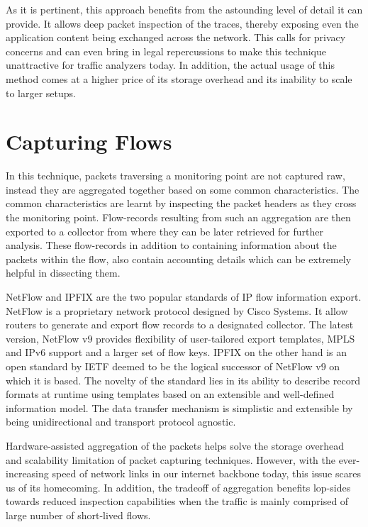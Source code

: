 As it is pertinent, this approach benefits from the astounding level of detail it can provide. It allows deep packet inspection of the traces, thereby exposing even the application content being exchanged  across the network. This calls for privacy concerns and can even bring in legal repercussions to make this technique unattractive for traffic analyzers today. In addition, the actual usage of this method comes at a higher price of its storage overhead and its inability to scale to larger setups.

\section{Capturing Flows}\label{sec:capturing-flows}
In this technique, packets traversing a monitoring point are not captured raw, instead they are aggregated together based on some common characteristics. The common characteristics are learnt by inspecting the packet headers as they cross the monitoring point. Flow-records resulting from such an aggregation are then exported to a collector from where they can be later retrieved for further analysis. These flow-records in addition to containing information about the packets within the flow, also contain accounting details which can be extremely helpful in dissecting them. 

NetFlow and \ac{IPFIX} are the two popular standards of \ac{IP} flow information export. NetFlow \cite{rfc3954} is a proprietary network protocol designed by Cisco Systems. It  allow routers to generate and export flow records to a designated collector. The latest version, NetFlow v$9$ provides flexibility of user-tailored export templates, \ac{MPLS} and \ac{IP}v$6$ support and a larger set of flow keys. \ac{IPFIX} \cite{rfc5101} on the other hand is an open standard by \ac{IETF} deemed to be the logical successor of NetFlow v$9$ on which it is based. The novelty of  the standard lies in its ability to describe record formats at runtime using templates based on an extensible and well-defined information model. The data transfer mechanism is simplistic and extensible by being unidirectional and transport protocol agnostic.  


Hardware-assisted aggregation of the packets helps solve the storage overhead and scalability limitation of packet capturing techniques. However, with the ever-increasing  speed of network links in our internet backbone today, this issue scares us of its homecoming. In addition, the tradeoff of aggregation benefits lop-sides towards reduced inspection capabilities when the traffic is mainly comprised of large number of short-lived flows. 

